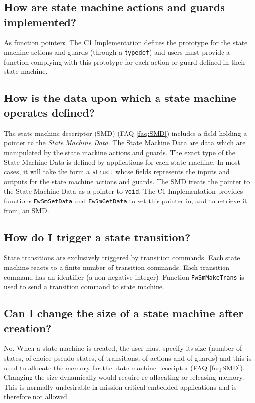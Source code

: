 \documentclass[a4paper,10pt]{article}
\begin{document}
\subsection{How are state machine actions and guards implemented?}
As function pointers. The C1 Implementation defines the prototype for the state machine actions and guards (through a \texttt{typedef}) and users must 
provide a function complying with this prototype for each action or guard defined in their state machine.  

\subsection{How is the data upon which a state machine operates defined?}\label{faq:state_machine_data}
The state machine descriptor (SMD) (FAQ \ref{faq:SMD}) includes a field holding a pointer to the \emph{State Machine Data}. The State Machine Data are data which 
are manipulated by the state machine actions and guards. The exact type of the State Machine Data is defined by applications for each state machine. 
In most cases, it will take the form a \texttt{struct} whose fields represents the inputs and outputs for the state machine actions and guards. 
The SMD treats the pointer to the State Machine Data as a pointer to \texttt{void}. The C1 Implementation provides functions \texttt{FwSmSetData} 
and \texttt{FwSmGetData} to set this pointer in, and to retrieve it from, an SMD.

\subsection{How do I trigger a state transition?}\label{faq:SM_StateTransition}
State transitions are exclusively triggered by transition commands. Each state machine reacts to a finite number of transition commands. Each transition 
command has an identifier (a non-negative integer). Function \texttt{FwSmMakeTrans} is used to send a transition command to state machine.

\subsection{Can I change the size of a state machine after creation?}
No. When a state machine is created, the user must specify its size (number of states, of choice pseudo-states, of transitions, of actions and of guards) 
and this is used to allocate the memory for the state machine descriptor (FAQ \ref{faq:SMD}). Changing the size dynamically would require re-allocating or 
releasing memory. This is normally undesirable in mission-critical embedded applications and is therefore not allowed. 
\end{document}
